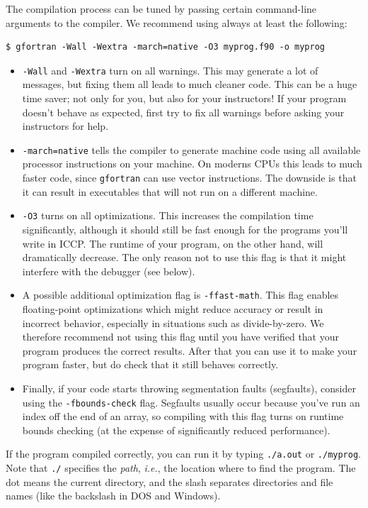 \documentclass[openany,oneside]{report}
\begin{document}
The compilation process can be tuned by passing certain command-line arguments to the compiler.
We recommend using always at least the following:
\begin{verbatim}
$ gfortran -Wall -Wextra -march=native -O3 myprog.f90 -o myprog
\end{verbatim}
\begin{itemize}
  \item \texttt{-Wall} and \texttt{-Wextra} turn on all warnings.
    This may generate a lot of messages, but fixing them all leads to much cleaner code.
    This can be a huge time saver; not only for you, but also for your instructors!
    If your program doesn't behave as expected, first try to fix all warnings before asking your instructors for help.
  \item \texttt{-march=native} tells the compiler to generate machine code using all available processor instructions on your machine.
    On moderns CPUs this leads to much faster code, since \texttt{gfortran} can use vector instructions.
    The downside is that it can result in executables that will not run on a different machine.
  \item \texttt{-O3} turns on all optimizations.
    This increases the compilation time significantly, although it should still be fast enough for the programs you'll write in ICCP.
    The runtime of your program, on the other hand, will dramatically decrease.
    The only reason not to use this flag is that it might interfere with the debugger (see below).
  \item A possible additional optimization flag is \texttt{-ffast-math}.
    This flag enables floating-point optimizations which might reduce accuracy or result in incorrect behavior, especially in situations such as divide-by-zero.
    We therefore recommend not using this flag until you have verified that your program produces the correct results.
    After that you can use it to make your program faster, but do check that it still behaves correctly.
  \item Finally, if your code starts throwing segmentation faults (segfaults), consider using the \texttt{-fbounds-check} flag.
    Segfaults usually occur because you've run an index off the end of an array, so compiling with this flag turns on runtime bounds checking (at the expense of significantly reduced performance).
\end{itemize}
If the program compiled correctly, you can run it by typing \texttt{./a.out} or \texttt{./myprog}.
Note that \texttt{./} specifies the \emph{path}, \emph{i.e.}, the location where to find the program.
The dot means the current directory, and the slash separates directories and file names (like the backslash in DOS and Windows).
\end{document}
